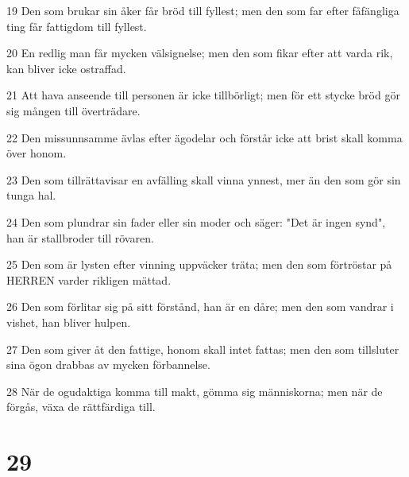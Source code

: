 \par 19 Den som brukar sin åker får bröd till fyllest; men den som far efter fåfängliga ting får fattigdom till fyllest.
\par 20 En redlig man får mycken välsignelse; men den som fikar efter att varda rik, kan bliver icke ostraffad.
\par 21 Att hava anseende till personen är icke tillbörligt; men för ett stycke bröd gör sig mången till överträdare.
\par 22 Den missunnsamme ävlas efter ägodelar och förstår icke att brist skall komma över honom.
\par 23 Den som tillrättavisar en avfälling skall vinna ynnest, mer än den som gör sin tunga hal.
\par 24 Den som plundrar sin fader eller sin moder och säger: "Det är ingen synd", han är stallbroder till rövaren.
\par 25 Den som är lysten efter vinning uppväcker träta; men den som förtröstar på HERREN varder rikligen mättad.
\par 26 Den som förlitar sig på sitt förstånd, han är en dåre; men den som vandrar i vishet, han bliver hulpen.
\par 27 Den som giver åt den fattige, honom skall intet fattas; men den som tillsluter sina ögon drabbas av mycken förbannelse.
\par 28 När de ogudaktiga komma till makt, gömma sig människorna; men när de förgås, växa de rättfärdiga till.

\chapter{29}

